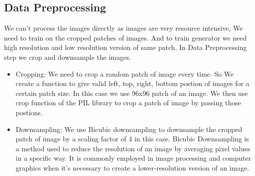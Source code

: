         \subsection{Data Preprocessing}
 We can't process the images directly as images are very resource intensive, We need to train on the cropped patches of images. And to train generator we need high resolution and low resolution version of same patch. In Data Preprocessing step we crop and downsample the images. 
    \begin{itemize}
        \item Cropping: We need to crop a random patch of image every time. So We create a function to give  valid left, top, right, bottom postion of images for a certain patch size. In this case we use 96x96 patch of an image. We then use crop function of the PIL library to crop a patch of image by passing those postions.
        \item Downsampling: We use Bicubic downsampling  to downsample the cropped patch of image by a scaling factor of 4 in this case. Bicubic Downsampling is a method used to reduce the resolution of an image by averaging pixel values in a specific way. It is commonly employed in image processing and computer graphics when it's necessary to create a lower-resolution version of an image.
    \end{itemize}
